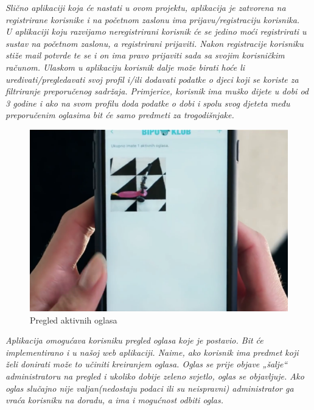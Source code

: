 		\newline
		\textit{Slično aplikaciji koja će nastati u ovom projektu, aplikacija je zatvorena na registrirane korisnike i na početnom zaslonu ima prijavu/registraciju korisnika. }\\
		\newline
		\textit{U aplikaciji koju razvijamo neregistrirani korisnik će se jedino moći registrirati u sustav na početnom zaslonu, a registrirani prijaviti. Nakon registracije korisniku stiže mail potvrde te se i on ima pravo prijaviti sada sa svojim korisničkim računom. Ulaskom u aplikaciju korisnik dalje može birati hoće li uređivati/pregledavati svoj profil i/ili dodavati podatke o djeci koji se koriste za filtriranje preporučenog sadržaja. Primjerice, korisnik ima muško dijete u dobi od 3 godine i ako na svom profilu doda podatke o dobi i spolu svog djeteta među preporučenim oglasima bit će samo predmeti za trogodišnjake.}\\
		\newline
		\begin{figure}[h!]
			\center
			\includegraphics{Picture3.png}
			\caption{ Pregled aktivnih oglasa}
			\label{fig3}
		\end{figure}
		\newline
		\textit{Aplikacija omogućava korisniku pregled oglasa koje je postavio. Bit će implementirano i u našoj web aplikaciji. Naime, ako korisnik ima predmet koji želi donirati može to učiniti kreiranjem oglasa. Oglas se prije objave „šalje“ administratoru na pregled i ukoliko dobije zeleno svjetlo, oglas se objavljuje. Ako oglas slučajno nije valjan(nedostaju podaci ili su neispravni) administrator ga vraća korisniku na doradu, a ima i mogućnost odbiti oglas.}\\
